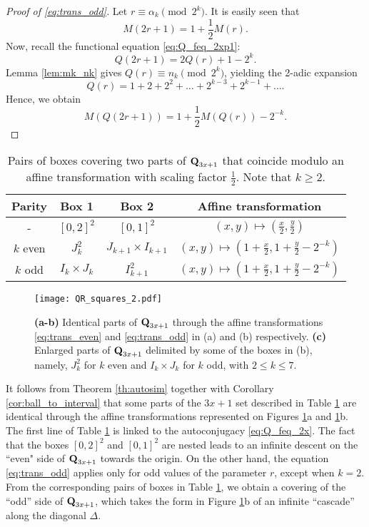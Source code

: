 \documentclass[12pt]{article}
\theoremstyle{definition}
\newcommand{\Qset}{\normalfont \textbf{Q}_{3x+1}}
\begin{document}
{{\begin{proof}[Proof of \eqref{eq:trans_odd}]
Let $r \equiv \alpha_k \pmod{2^k}$. It is easily seen that $$M(2r+1) = 1 + \frac12 M(r).$$
Now, recall the functional equation \eqref{eq:Q_feq_2xp1}:
$$Q(2r+1) = 2Q(r) + 1 - 2^k.$$
Lemma \ref{lem:mk_nk} gives $Q(r) \equiv n_k \pmod{2^k}$, yielding the 2-adic expansion
$$ Q(r) = 1 + 2 + 2^2 + \ldots + 2^{k-3} + 2^{k-1} + \ldots.$$
Hence, we obtain
$$M(Q(2r+1)) = 1 + \frac12 M(Q(r)) - 2^{-k}.$$
\end{proof}

{\renewcommand{\arraystretch}{1.5}
\begin{table} 
\caption{Pairs of boxes covering two parts of $\Qset$ that coincide modulo an affine transformation with scaling factor $\frac{1}{2}$. Note that $k \geq 2$.}
\label{tab:squares}
\begin{center}
\begin{tabular}{|c|c|c|c|}
\hline
Parity &  Box 1  &  Box 2 & Affine transformation  \\
 \hline
 \hline
- & $[0, 2]^2$ & $[0, 1]^2$ & $(x,y) \longmapsto \left( \frac{x}{2}, \frac{y}{2} \right)$ \\
$k$ even & $J_{k}^{2}$ & $J_{k+1} \times I_{k+1}$ & $(x,y) \longmapsto \left( 1+\frac{x}{2}, 1+\frac{y}{2}-2^{-k} \right)$ \\
$k$ odd & $I_{k} \times J_{k}$ & $I_{k+1}^{2}$ & $(x,y) \longmapsto \left( 1+\frac{x}{2}, 1+\frac{y}{2}-2^{-k} \right)$ \\
 \hline
\end{tabular}
\end{center}
\end{table}
}

\begin{figure}
\centering
\texttt{[image: QR\_squares\_2.pdf]}
\caption{\textbf{(a-b)} Identical parts of $\Qset$ through the affine transformations \eqref{eq:trans_even} and \eqref{eq:trans_odd} in (a) and (b) respectively. \textbf{(c)} Enlarged parts of $\Qset$ delimited by some of the boxes in (b), namely, $J_{k}^{2}$ for $k$ even and $I_{k} \times J_{k}$ for $k$ odd, with $2 \leq k \leq 7$.}
\label{fig:QR_squares}
\end{figure}

It follows from Theorem \ref{th:autosim} together with Corollary \ref{cor:ball_to_interval} that some parts of the $3x+1$ set described in Table \ref{tab:squares} are identical through the affine transformations represented on Figures \ref{fig:QR_squares}a and \ref{fig:QR_squares}b. The  first line of Table \ref{tab:squares} is linked to the autoconjugacy \eqref{eq:Q_feq_2x}. The fact that the boxes $[0, 2]^2$ and $[0, 1]^2$ are nested leads to an infinite descent on the ``even" side of $\Qset$ towards the origin. On the other hand, the equation \eqref{eq:trans_odd} applies only for odd values of the parameter $r$, except when $k=2$. From the corresponding pairs of boxes in Table \ref{tab:squares}, we obtain a covering of the ``odd'' side of $\Qset$, which takes the form in Figure \ref{fig:QR_squares}b of an infinite ``cascade'' along the diagonal $\Delta$.

}}
\end{document}
